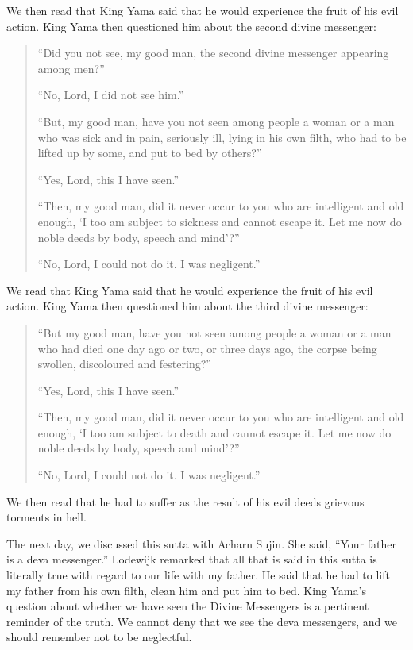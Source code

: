 We then read that King Yama said that he would experience the fruit of his evil action. King Yama then questioned him about the second divine messenger:
\begin{quote}

``Did you not see, my good man, the second divine messenger appearing among men?''

``No, Lord, I did not see him.''

``But, my good man, have you not seen among people a woman or a man who was sick and in pain, seriously ill, lying in his own filth, who had to be lifted up by some, and put to bed by others?''

``Yes, Lord, this I have seen.''

``Then, my good man, did it never occur to you who are intelligent and old enough, `I too am subject to sickness and cannot escape it. Let me now do noble deeds by body, speech and mind'?''

``No, Lord, I could not do it. I was negligent.''

\end{quote}

We read that King Yama said that he would experience the fruit of his evil action. King Yama then questioned him about the third divine messenger:
\begin{quote}

``But my good man, have you not seen among people a woman or a man who had died one day ago or two, or three days ago, the corpse being swollen, discoloured and festering?''

``Yes, Lord, this I have seen.''

``Then, my good man, did it never occur to you who are intelligent and old enough, `I too am subject to death and cannot escape it. Let me now do noble deeds by body, speech and mind'?''

``No, Lord, I could not do it. I was negligent.''

\end{quote}

We then read that he had to suffer as the result of his evil deeds grievous torments in hell.

The next day, we discussed this sutta with Acharn Sujin. She said, ``Your father is a deva messenger.'' Lodewijk remarked that all that is said in this sutta is literally true with regard to our life with my father. He said that he had to lift my father from his own filth, clean him and put him to bed. King Yama’s question about whether we have seen the Divine Messengers is a pertinent reminder of the truth.
We cannot deny that we see the deva messengers, and we should remember not to be neglectful.

